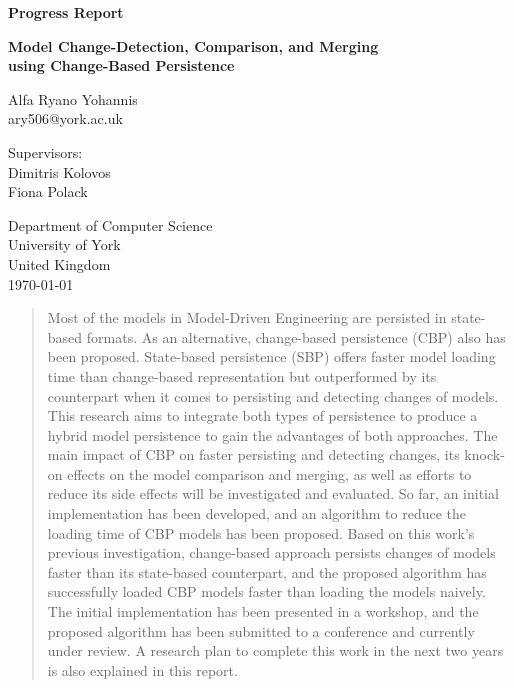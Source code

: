\documentclass[12pt, a4paper]{report} \usepackage[titletoc]{appendix}
\begin{document}
\begin{titlepage}
 \begin{center}

\textbf{Progress Report}
\vspace{1cm}

\textbf{\large Model Change-Detection, Comparison, and Merging\\using Change-Based Persistence}
\vspace{1cm}

Alfa Ryano Yohannis\\
ary506@york.ac.uk
\vspace{1cm}

Supervisors:\\
Dimitris Kolovos\\
Fiona Polack\\
\vspace{1cm}

Department of Computer Science\\
University of York\\
United Kingdom\\
\vspace{1cm}
\today
 
\vfill
 
\end{center}
\end{titlepage}


\begin{abstract}
Most of the models in Model-Driven Engineering are persisted in state-based formats. As an alternative, change-based persistence (CBP) also has been proposed. State-based persistence (SBP) offers faster model loading time than change-based representation but outperformed by its counterpart when it comes to persisting and detecting changes of models. This research aims to integrate both types of persistence to produce a hybrid model persistence to gain the advantages of both approaches. The main impact of CBP on faster persisting and detecting changes, its knock-on effects on the model comparison and merging, as well as efforts to reduce its side effects will be investigated and evaluated. So far, an initial implementation has been developed, and an algorithm to reduce the loading time of CBP models has been proposed. Based on this work's previous investigation, change-based approach persists changes of models faster than its state-based counterpart, and the proposed algorithm has successfully loaded CBP models faster than loading the models naively. The initial implementation has been presented in a workshop, and the proposed algorithm has been submitted to a conference and currently under review. A research plan to complete this work in the next two years is also explained in this report.
\end{abstract}
\end{document}
